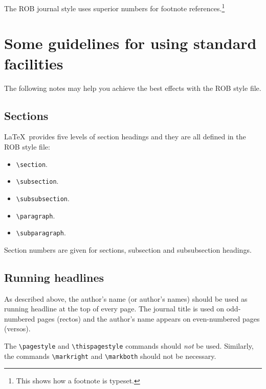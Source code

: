 \documentclass[DTMColor]{ROB-New}
\begin{document}
The ROB journal style uses superior numbers for footnote
references.\footnote{This shows how a footnote is typeset.}

\section{Some guidelines for using standard facilities}

The following notes may help you achieve the best effects with the ROB style
file.

\subsection{Sections}

\LaTeX\ provides five levels of section headings and they are all
defined in the ROB style file:
\begin{itemize}
  \item \verb"\section".
  \item \verb"\subsection".
  \item \verb"\subsubsection".
  \item \verb"\paragraph".
  \item \verb"\subparagraph".
\end{itemize}
Section numbers are given for sections, subsection and subsubsection headings.

\subsection{Running headlines}

As described above, the author's name (or author's
names) should be used as running headline at the top of every page.
The journal title is used on odd-numbered pages (rectos) and the author's name appears
on even-numbered pages (versos).

The \verb"\pagestyle" and \verb"\thispagestyle" commands should {\em not\/} be
used.
Similarly, the commands \verb"\markright" and \verb"\markboth" should not be
necessary.
\end{document}

